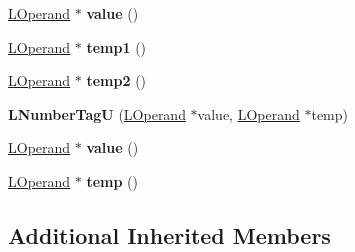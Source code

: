 \begin{DoxyCompactItemize}
\item 
\hyperlink{classv8_1_1internal_1_1_l_operand}{L\+Operand} $\ast$ {\bfseries value} ()\hypertarget{classv8_1_1internal_1_1_l_number_tag_u_a250600d81f63976f70111c5b90a2a5c3}{}\label{classv8_1_1internal_1_1_l_number_tag_u_a250600d81f63976f70111c5b90a2a5c3}

\item 
\hyperlink{classv8_1_1internal_1_1_l_operand}{L\+Operand} $\ast$ {\bfseries temp1} ()\hypertarget{classv8_1_1internal_1_1_l_number_tag_u_af1b9a9050ae593071ec641d8db810594}{}\label{classv8_1_1internal_1_1_l_number_tag_u_af1b9a9050ae593071ec641d8db810594}

\item 
\hyperlink{classv8_1_1internal_1_1_l_operand}{L\+Operand} $\ast$ {\bfseries temp2} ()\hypertarget{classv8_1_1internal_1_1_l_number_tag_u_afac0fd287b623c724001aee50155b71c}{}\label{classv8_1_1internal_1_1_l_number_tag_u_afac0fd287b623c724001aee50155b71c}

\item 
{\bfseries L\+Number\+TagU} (\hyperlink{classv8_1_1internal_1_1_l_operand}{L\+Operand} $\ast$value, \hyperlink{classv8_1_1internal_1_1_l_operand}{L\+Operand} $\ast$temp)\hypertarget{classv8_1_1internal_1_1_l_number_tag_u_a11d948aa8adf7a4e01a2cf888db64118}{}\label{classv8_1_1internal_1_1_l_number_tag_u_a11d948aa8adf7a4e01a2cf888db64118}

\item 
\hyperlink{classv8_1_1internal_1_1_l_operand}{L\+Operand} $\ast$ {\bfseries value} ()\hypertarget{classv8_1_1internal_1_1_l_number_tag_u_a250600d81f63976f70111c5b90a2a5c3}{}\label{classv8_1_1internal_1_1_l_number_tag_u_a250600d81f63976f70111c5b90a2a5c3}

\item 
\hyperlink{classv8_1_1internal_1_1_l_operand}{L\+Operand} $\ast$ {\bfseries temp} ()\hypertarget{classv8_1_1internal_1_1_l_number_tag_u_a0032afc7d73dd5811b4518461a81a039}{}\label{classv8_1_1internal_1_1_l_number_tag_u_a0032afc7d73dd5811b4518461a81a039}

\end{DoxyCompactItemize}
\subsection*{Additional Inherited Members}


